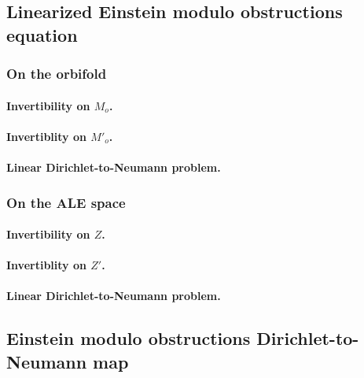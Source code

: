\documentclass[12pt]{article}
\begin{document}
\subsection{Linearized Einstein modulo obstructions equation}

\subsubsection{On the orbifold}

\paragraph{Invertibility on $M_o$.}

\paragraph{Invertiblity on $M'_o$.}

\paragraph{Linear Dirichlet-to-Neumann problem.}



\subsubsection{On the ALE space}


\paragraph{Invertibility on $Z$.}

\paragraph{Invertiblity on $Z'$.}

\paragraph{Linear Dirichlet-to-Neumann problem.}



\subsection{Einstein modulo obstructions Dirichlet-to-Neumann map}

\end{document}

